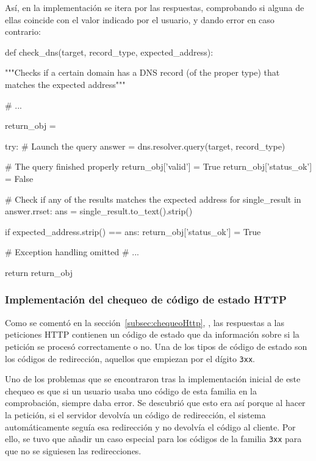Así, en la implementación se itera por las respuestas, comprobando si alguna de
ellas coincide con el valor indicado por el usuario, y dando error en caso contrario:

\begin{pythoncode}
def check_dns(target, record_type, expected_address):

    """Checks if a certain domain has a DNS record (of the proper type) 
    that matches the expected address"""

    # ...

    return_obj = {}

    try:
        # Launch the query
        answer = dns.resolver.query(target, record_type)

        # The query finished properly
        return_obj['valid'] = True
        return_obj['status_ok'] = False

        # Check if any of the results matches the expected address
        for single_result in answer.rrset:
            ans = single_result.to_text().strip()

            if expected_address.strip() == ans:
                return_obj['status_ok'] = True

    # Exception handling omitted
    # ...

    return return_obj 
\end{pythoncode}

\subsubsection{Implementación del chequeo de código de estado HTTP}

Como se comentó en la sección~\ref{subsec:chequeoHttp},
\textit{}, las respuestas a las peticiones HTTP
contienen un código de estado que da información sobre si la petición se procesó
correctamente o no. Una de los tipos de código de estado son los códigos de
redirección, aquellos que empiezan por el dígito \texttt{3xx}.

Uno de los problemas que se encontraron tras la implementación inicial de este
chequeo es que si un usuario usaba uno código de esta familia en la
comprobación, siempre daba error. Se descubrió que esto era así porque al hacer
la petición, si el servidor devolvía un código de redirección, el sistema
automáticamente seguía esa redirección y no devolvía el código al cliente. Por
ello, se tuvo que añadir un caso especial para los códigos de la familia
\texttt{3xx} para que no se siguiesen las redirecciones.

